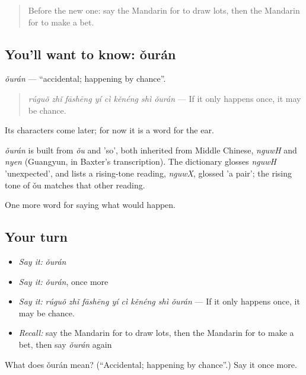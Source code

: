 \label{lesson:ZH-C528-ouran}



\begin{quote}
Before the new one: say the Mandarin for to draw lots, then the Mandarin for to make a bet.
\end{quote}

\subsection*{You'll want to know: ǒurán}
\emph{ǒurán} — \textquotedblleft{}accidental; happening by chance\textquotedblright{}.

\begin{quote}
\emph{rúguǒ zhǐ fāshēng yí cì kěnéng shì ǒurán} — If it only happens once, it may be chance.
\end{quote}

Its characters come later; for now it is a word for the ear.

\begin{cousinweb}
\emph{ǒurán} is built from \emph{ǒu} and  'so', both inherited from Middle Chinese, \emph{nguwH} and \emph{nyen} (Guangyun, in Baxter's transcription). The dictionary glosses \emph{nguwH} 'unexpected', and lists a rising-tone reading, \emph{nguwX}, glossed 'a pair'; the rising tone of ǒu matches that other reading.
\end{cousinweb}

\begin{grammarlens}[title={What you've built}]
One more word for saying what would happen.
\end{grammarlens}

\subsection*{Your turn}
\begin{itemize}
\raggedright
  \item \emph{Say it:} \emph{ǒurán}
  \item \emph{Say it:} \emph{ǒurán}, once more
  \item \emph{Say it:} \emph{rúguǒ zhǐ fāshēng yí cì kěnéng shì ǒurán} — If it only happens once, it may be chance.
  \item \emph{Recall:} say the Mandarin for to draw lots, then the Mandarin for to make a bet, then say \emph{ǒurán} again
\end{itemize}

\begin{tcolorbox}[breakable,colback=teal!4,colframe=teal!35!black,title={Before you move on}]
What does ǒurán mean? (\textquotedblleft{}Accidental; happening by chance\textquotedblright{}.) Say it once more.
\end{tcolorbox}
